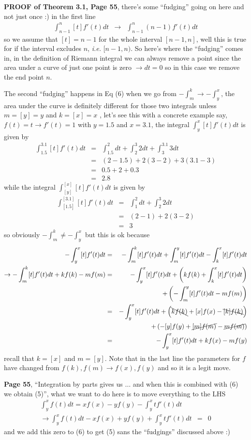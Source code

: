 \documentclass[aps,preprint,preprintnumbers,nofootinbib,showpacs,prd]{revtex4-1}
\newcommand{\ie}{{\it i.e.} }
\newcommand{\nbea}{\begin{eqnarray*}}
\newcommand{\neea}{\end{eqnarray*}}
\begin{document}
{\bf PROOF of Theorem 3.1, Page 55}, there's some ``fudging'' going on here and not just once :) in the first line
%
\nbea
\int_{n-1}^{n}[t] f'(t)dt & \to & \int_{n-1}^n (n-1)f'(t)dt
\neea
%
so we assume that $[t] = n-1$ for the whole interval $[n-1,n]$, well this is true for if the interval excludes $n$, \ie $[n-1,n)$. So here's where the ``fudging'' comes in, in the definition of Riemann integral we can always remove a point since the area under a curve of just one point is zero $\to dt = 0$ so in this case we remove the end point $n$.

The second ``fudging'' happens in Eq (6) when we go from $-\int_m^k \to -\int_y^x$, the area under the curve is definitely different for those two integrals unless $m=[y]=y$ and $k=[x]=x$ , let's see this with a concrete example say, $f(t) = t \to f'(t) = 1$ with $y = 1.5$ and $x = 3.1$, the integral $\int_y^x[t]f'(t)dt$ is given by
%
\nbea
\int_{1.5}^{3.1}[t]f'(t)dt & = & \int_{1.5}^{2}dt + \int_{2}^{3}2dt+  \int_{3}^{3.1}3dt \\
& = & (2-1.5) + 2(3-2) + 3(3.1-3) \\
& = & 0.5 + 2 + 0.3 \\
& = & 2.8
\neea
%
while the integral $\int_{[y]}^{[x]}[t]f'(t)dt$ is given by
%
\nbea
\int_{[1.5]}^{[3.1]}[t]f'(t)dt & = & \int_{1}^{2}dt + \int_{2}^{3}2dt \\
& = & (2-1) + 2(3-2) \\
& = & 3
\neea
%
so obviously $-\int_m^k \neq -\int_y^x$ but this is ok because
%
\nbea
-\int_y^x [t]f'(t)dt & = & -\int_m^k [t]f'(t)dt +\int_m^y [t]f'(t)dt -\int_k^x [t]f'(t)dt \\
\to -\int_m^k [t]f'(t)dt +kf(k) - mf(m) & = & -\int_y^x [t]f'(t)dt + \left ( kf(k) + \int_k^x [t]f'(t)dt\right ) \\
&& + \left (-\int_m^y [t]f'(t)dt - mf(m) \right) \\
& = & -\int_y^x [t]f'(t)dt + \left ( \bcancel{kf(k)} +[x]f(x) - \bcancel{[k]f(k)} \right ) \\
&& + \left (- [y]f(y) + \cancel{[m]f(m)} - \cancel{mf(m)} \right) \\
& = & -\int_y^x [t]f'(t)dt + kf(x) - mf(y)
\neea
%
recall that $k = [x]$ and $m=[y]$. Note that in the last line the parameters for $f$ have changed from $f(k),f(m) \to f(x),f(y)$ and so it is a legit move.

{\bf Page 55}, ``Integration by parts gives us $\dots$ and when this is combined with (6) we obtain (5)'', what we want to do here is to move everything to the LHS
%
\nbea
\int_y^x f(t)dt = xf(x) - yf(y) - \int_y^xtf'(t)dt \\
\to \int_y^x f(t)dt - xf(x) + yf(y) + \int_y^xtf'(t)dt & = & 0
\neea
%
and we add this zero to (6) to get (5) sans the ``fudgings'' discussed above :)
\end{document}
